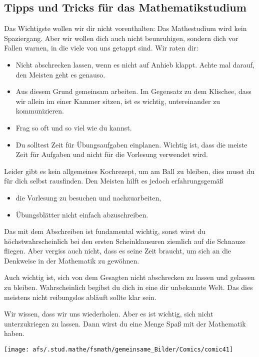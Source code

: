 \subsection{Tipps und Tricks für das Mathematikstudium}
Das Wichtigste wollen wir dir nicht vorenthalten:
Das Mathestudium wird kein Spaziergang.
Aber wir wollen dich auch nicht beunruhigen,
sondern dich vor Fallen warnen, in die viele von uns getappt sind.
Wir raten dir:
\begin{itemize}
\item
Nicht abschrecken lassen, wenn es nicht auf Anhieb klappt.
Achte mal darauf, den Meisten geht es genauso.

\item
Aus diesem Grund gemeinsam arbeiten.
Im Gegensatz zu dem Klischee, dass wir allein im einer Kammer sitzen, ist es wichtig, untereinander zu kommunizieren.

\item
Frag so oft und so viel wie du kannst.

\item
Du solltest Zeit für Übungsaufgaben einplanen.
Wichtig ist, dass die meiste Zeit für Aufgaben und nicht für die
Vorlesung verwendet wird.
\end{itemize}
Leider gibt es kein allgemeines Kochrezept, um am Ball zu bleiben,
dies musst du für dich selbst rausfinden.
Den Meisten hilft es jedoch erfahrungsgemäß
\begin{itemize}
\item
die Vorlesung zu besuchen und nachzuarbeiten,
\item
Übungsblätter nicht einfach abzuschreiben.
\end{itemize}
Das mit dem Abschreiben ist fundamental wichtig,
sonst wirst du höchstwahrscheinlich bei den ersten Scheinklausuren
ziemlich auf die Schnauze fliegen.
Aber vergiss auch nicht,
dass es seine Zeit braucht,
um sich an die Denkweise in der Mathematik zu gewöhnen.

Auch wichtig ist,
sich von dem Gesagten nicht abschrecken zu lassen und gelassen zu bleiben.
Wahrscheinlich begibst du dich in eine dir unbekannte Welt.
Das dies meistens nicht reibungslos abläuft sollte klar sein.

Wir wissen, dass wir uns wiederholen.
Aber es ist wichtig, sich nicht unterzukriegen zu lassen.
Dann wirst du eine Menge Spaß mit der Mathematik haben.
  
\newpage
\vspace*{4cm}
{

}
{
\begin{center}
  \texttt{[image: afs/.stud.mathe/fsmath/gemeinsame\_Bilder/Comics/comic41]}
\end{center}
}
\newpage

